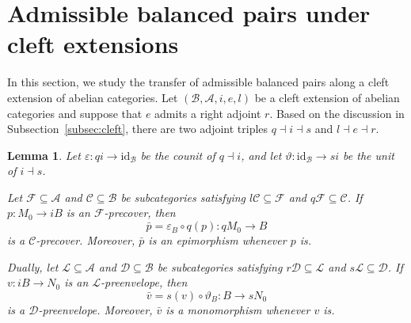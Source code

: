 \documentclass[11pt]{amsart}
\newtheorem{lemma}[theorem]{Lemma}
\theoremstyle{definition}
\theoremstyle{remark}
\theoremstyle{plain}
\numberwithin{equation}{section}
\begin{document}
\section{Admissible balanced pairs under cleft extensions}\label{sec:induced}
In this section, we study the transfer of admissible balanced pairs along a cleft extension of abelian categories.
Let $(\mathcal{B}, \mathcal{A}, i, e, l)$ be a cleft extension of abelian categories and suppose that $e$ admits a right adjoint $r$. Based on the discussion in Subsection~\ref{subsec:cleft}, there are two adjoint triples $q \dashv i \dashv s$ and $l \dashv e \dashv r$.
\begin{lemma}\label{lem:transfer}
	Let $\varepsilon:qi\to\mathrm{id}_{\mathcal{B}}$ be the counit
	of $q\dashv i$, and let
	$\vartheta:\mathrm{id}_{\mathcal{B}}\to si$ be the unit of
	$i\dashv s$.
	
	Let $\mathcal{F}\subseteq\mathcal{A}$ and
	$\mathcal{C}\subseteq\mathcal{B}$ be subcategories satisfying
	$l\mathcal{C}\subseteq\mathcal{F}$ and
	$q\mathcal{F}\subseteq\mathcal{C}$.
	If $p:M_0\to iB$ is an $\mathcal{F}$-precover, then
	\[
	\bar p=\varepsilon_B\circ q(p):qM_0\longrightarrow B
	\]
	is a $\mathcal{C}$-precover. Moreover, $\bar p$ is an epimorphism whenever $p$ is.
	
	Dually, let $\mathcal{L}\subseteq\mathcal{A}$ and $\mathcal{D}\subseteq\mathcal{B}$ be subcategories satisfying
	$r\mathcal{D}\subseteq\mathcal{L}$ and
	$s\mathcal{L}\subseteq\mathcal{D}$.
	If $v:iB\to N_0$ is an $\mathcal{L}$-preenvelope, then
	\[
	\bar v=s(v)\circ\vartheta_B:B\longrightarrow sN_0
	\]
	is a $\mathcal{D}$-preenvelope. Moreover, $\bar v$ is a monomorphism whenever $v$ is.
\end{lemma}
\end{document}
